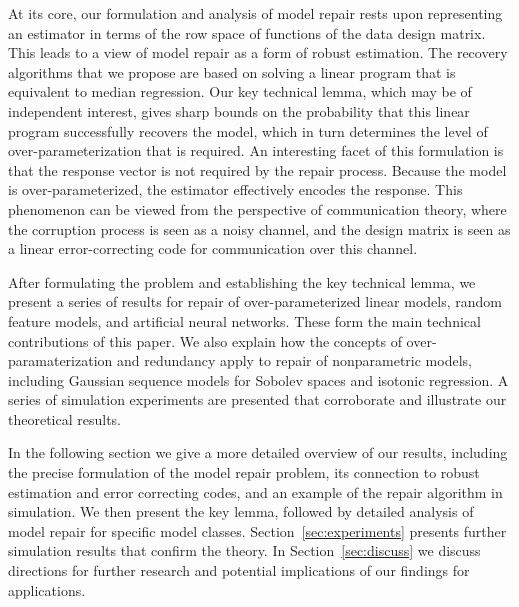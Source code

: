 At its core, our formulation and analysis of model repair rests upon representing an estimator in
terms of the row space of functions of the data design matrix. This leads to a view of model repair
as a form of robust estimation. The recovery algorithms that we propose are based on solving a linear program that is equivalent to median regression. Our key technical lemma, which may be of independent interest, gives sharp bounds on the probability that this linear program successfully recovers the model, which in turn determines the level of over-parameterization that is required. An interesting facet of this formulation is that the response vector is not required by the repair process. Because the model is over-parameterized, the estimator effectively encodes the response. This phenomenon can be viewed from the perspective of communication theory, where the corruption process is seen as a noisy channel, and the design matrix is seen as a linear error-correcting code for communication over this channel.

After formulating the problem  and establishing the key technical lemma, we present a series of results for
repair of over-parameterized linear models, random feature models, and artificial neural networks. These form the main technical contributions of this paper. We also explain how the concepts of over-paramaterization and redundancy apply to repair of nonparametric models, including Gaussian sequence models for Sobolev spaces and isotonic regression.
A series of simulation experiments are presented that corroborate and illustrate our theoretical results.

In the following section we give a more detailed overview of our results, including the precise formulation of the model repair problem, its connection to robust estimation and error correcting codes, and an example of the repair algorithm in simulation. We then present the key lemma, followed by detailed analysis of model repair for specific model classes. Section~\ref{sec:experiments} presents  further simulation results that confirm the theory. In Section~\ref{sec:discuss} we discuss directions for further research and potential implications of our findings for applications.
